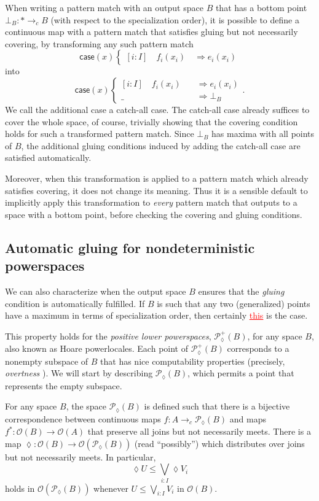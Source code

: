 \documentclass[conference]{IEEEtran}
\newcommand{\PLower}{\mathcal{P}_\lozenge}
\newcommand{\cto}{\to_c}
\newcommand{\One}{\ast}
\newcommand{\Open}[1]{\mathcal{O}({#1})}
\newcommand{\wildcard}{\_}
\newcommand{\Branch}{\Rightarrow}
\newcommand{\iimg}[1]{#1^*}
\newcommand{\grammar}[1]{\textcolor{red}{\underline{#1}}}
\begin{document}
When writing a pattern match with an output space $B$ that has a bottom point $\bot_B : \One \cto B$ (with respect to the specialization order), it is possible to define a continuous map with a pattern match that satisfies gluing but not necessarily covering, by transforming any such pattern match
\[
\mathsf{case}(x)
\begin{cases}
[i : I] \quad f_i(x_i) \quad \Branch e_i(x_i)
\end{cases}
\]
into
\[
\mathsf{case}(x)
\begin{cases}
[i : I] \quad f_i(x_i) \quad &\Branch e_i(x_i)
\\ \wildcard \quad &\Branch \bot_B
\end{cases}.
\]
We call the additional case a catch-all case.
The catch-all case already suffices to cover the whole space, of course, trivially showing that the covering condition holds for such a transformed pattern match. Since $\bot_B$ has maxima with all points of $B$, the additional gluing conditions induced by adding the catch-all case are satisfied automatically.

Moreover, when this transformation is applied to a pattern match which already satisfies covering, it does not change its meaning. Thus it is a sensible default to implicitly apply this transformation to \emph{every} pattern match that outputs to a space with a bottom point, before checking the covering and gluing conditions. 

\subsection{Automatic gluing for nondeterministic powerspaces}

We can also characterize when the output space $B$ ensures that the \emph{gluing} condition is automatically fulfilled. If $B$ is such that any two (generalized) points have a maximum in terms of specialization order, then certainly \grammar{this} is the case.

This property holds for the \emph{positive lower powerspaces}, $\PLower^+(B)$, for any space $B$, also known as Hoare powerlocales. Each point of $\PLower^+(B)$ corresponds to a nonempty subspace of $B$ that has nice computability properties (precisely, \emph{overtness} \cite{vickersdoublepowerlocale}). We will start by describing $\PLower(B)$, which permits a point that represents the empty subspace. 

For any space $B$, the space $\PLower(B)$ is defined such that there is a bijective correspondence between continuous maps $f : A \cto \PLower(B)$ and maps $\iimg{f} : \Open{B} \to \Open{A}$ that preserve all joins but not necessarily meets. There is a map $\lozenge : \Open{B} \to \Open{\PLower(B)}$ (read ``possibly'') which distributes over joins but not necessarily meets. In particular,
\[
\lozenge U \le \bigvee_{i : I} \lozenge V_i
\]
holds in $\Open{\PLower(B)}$ whenever $U \le \bigvee_{i : I} V_i$ in $\Open{B}$. 
\end{document}
